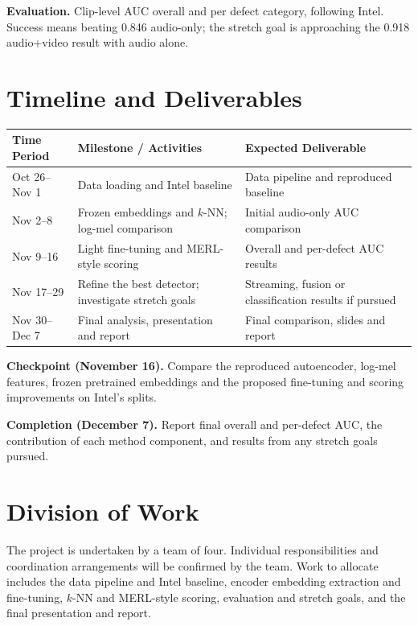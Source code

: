 \documentclass[11pt]{article}
\begin{document}
\textbf{Evaluation.} Clip-level AUC overall and per defect category, following Intel. Success means beating 0.846 audio-only; the stretch goal is approaching the 0.918 audio+video result with audio alone.

\section{Timeline and Deliverables}

\begin{center}
\small
\begin{tabularx}{\textwidth}{p{} >{\raggedright\arraybackslash}X >{\raggedright\arraybackslash}X}
    \toprule
    \textbf{Time Period} & \textbf{Milestone / Activities} & \textbf{Expected Deliverable} \\
    \midrule
    Oct 26--Nov 1 & Data loading and Intel baseline & Data pipeline and reproduced baseline \\
    Nov 2--8 & Frozen embeddings and $k$-NN; log-mel comparison & Initial audio-only AUC comparison \\
    Nov 9--16 & Light fine-tuning and MERL-style scoring & Overall and per-defect AUC results \\
    Nov 17--29 & Refine the best detector; investigate stretch goals & Streaming, fusion or classification results if pursued \\
    Nov 30--Dec 7 & Final analysis, presentation and report & Final comparison, slides and report \\
    \bottomrule
\end{tabularx}
\end{center}

\textbf{Checkpoint (November 16).} Compare the reproduced autoencoder, log-mel features, frozen pretrained embeddings and the proposed fine-tuning and scoring improvements on Intel's splits.

\textbf{Completion (December 7).} Report final overall and per-defect AUC, the contribution of each method component, and results from any stretch goals pursued.

\section{Division of Work}

The project is undertaken by a team of four. Individual responsibilities and coordination arrangements will be confirmed by the team. Work to allocate includes the data pipeline and Intel baseline, encoder embedding extraction and fine-tuning, $k$-NN and MERL-style scoring, evaluation and stretch goals, and the final presentation and report.
\end{document}
